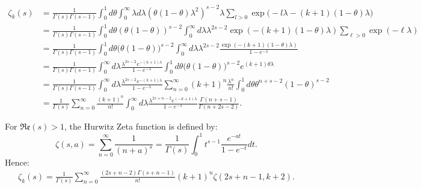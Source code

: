\documentclass{article}
\theoremstyle{definition}
\theoremstyle{remark}
\begin{document}
\begin{align*}
\zeta_{k}(s)&=\frac{1}{\Gamma(s)\Gamma(s-1)}\int_{0}^{1}d\theta\int_{0}^{\infty}\lambda d\lambda  \left(\theta (1-\theta)\lambda^{2}\right)^{s-2}\lambda \sum_{l>0} \exp\big(-l\lambda-(k+1)(1-\theta)\lambda \big)\\&= \frac{1}{\Gamma(s)\Gamma(s-1)}\int_{0}^{1}d\theta (\theta(1-\theta))^{s-2}\int_{0}^{\infty}d\lambda \lambda^{2s-2}\exp(-(k+1)(1-\theta)\lambda)\sum_{\ell>0}\exp(-\ell\lambda) \\&=\frac{1}{\Gamma(s)\Gamma(s-1)}\int_{0}^{1}d\theta \big(\theta(1-\theta) \big)^{s-2}\int_{0}^{\infty}d\lambda \lambda^{2s-2}\frac{\exp(-(k+1)(1-\theta)\lambda)}{1-e^{-\lambda}} \\&=\frac{1}{\Gamma(s)\Gamma(s-1)}\int_{0}^{\infty}d\lambda\frac{\lambda^{2s-2} e^{-(k+1)\lambda}}{1-e^{-\lambda}}\int_{0}^{1}d\theta \big(\theta(1-\theta) \big)^{s-2} e^{(k+1)\theta\lambda}\\&=\frac{1}{\Gamma(s)\Gamma(s-1)}\int_{0}^{\infty}d\lambda \frac{\lambda^{2s-2}e^{-(k+1)\lambda}}{1-e^{-\lambda}}\sum_{n=0}^{\infty}(k+1)^{n}\frac{\lambda^{n}}{n!}\int_{0}^{1}d\theta\theta^{n+s-2}(1-\theta)^{s-2} \\&=\frac{1}{\Gamma(s)}\sum_{n=0}^{\infty}\frac{(k+1)^{n}}{n!}\int_{0}^{\infty}d\lambda \frac{\lambda^{2s+n-2}e^{(-k+1)\lambda}}{1-e^{-\lambda}}\frac{\Gamma(n+s-1)}{\Gamma(n+2s-2)}.
\end{align*}

For $\mathfrak{Re}(s)>1$, the Hurwitz Zeta function \cite[Chapter 12] {ApostolAnalyticNumberLivre} is defined by: $$\zeta(s,a)=\sum_{n=0}^{\infty}\frac{1}{(n+a)^{s}}=\frac{1}{\Gamma(s)}\int_{0}^{1}t^{s-1}\frac{e^{-at}}{1-e^{-t}}dt.$$ Hence: 
\begin{align*}
    \zeta_{k}(s)=\frac{1}{\Gamma(s)}\sum_{n=0}^{\infty}\frac{(2s+n-2)\Gamma(s+n-1)}{n!}(k+1)^{n}\zeta(2s+n-1,k+2).
\end{align*}
\end{document}
